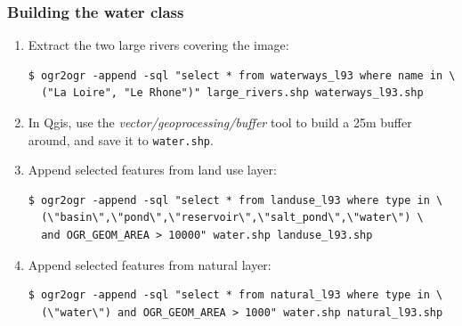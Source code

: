 \documentclass[8pt]{beamer}
\begin{document}
\begin{frame}[fragile]
\frametitle{Building the water class}
\begin{enumerate}
\item Extract the two large rivers covering the image:
\begin{scriptsize}
\begin{verbatim}
$ ogr2ogr -append -sql "select * from waterways_l93 where name in \
  ("La Loire", "Le Rhone")" large_rivers.shp waterways_l93.shp
\end{verbatim}
\end{scriptsize}

\item In Qgis, use the \textit{vector/geoprocessing/buffer} tool to build a 25m buffer around, and save it to \texttt{water.shp}.

\item Append selected features from land use layer:
\begin{scriptsize}
\begin{verbatim}
$ ogr2ogr -append -sql "select * from landuse_l93 where type in \ 
  (\"basin\",\"pond\",\"reservoir\",\"salt_pond\",\"water\") \
  and OGR_GEOM_AREA > 10000" water.shp landuse_l93.shp
\end{verbatim}
\end{scriptsize}

\item Append selected features from natural layer:
\begin{scriptsize}
\begin{verbatim}
$ ogr2ogr -append -sql "select * from natural_l93 where type in \
  (\"water\") and OGR_GEOM_AREA > 1000" water.shp natural_l93.shp
\end{verbatim}
\end{scriptsize}
\end{enumerate}
\end{frame}
\end{document}
